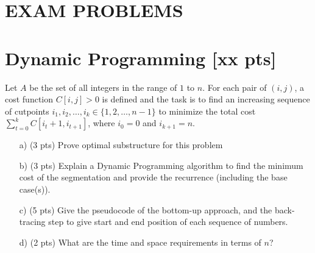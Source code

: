 \documentclass{article}
\begin{document}
\section*{EXAM PROBLEMS}
\color{black}
\section{Dynamic Programming [xx pts]} %
Let $A$ be the set of all integers in the range of $1$ to $n$. For each pair of $(i,j)$, a cost function $C[i,j] > 0$ is defined and the task is to find an increasing sequence of cutpoints $i_1, i_2, \ldots, i_k \in \{1,2,\ldots,n-1\}$ to minimize the total cost $\sum_{t=0}^k C[i_t + 1, i_{t+1}]$, where $i_0=0$ and $i_{k+1} = n$.



\begin{itemize}
\item[a)] (3 pts) Prove optimal substructure for this problem
\item[b)] (3 pts) Explain a Dynamic Programming algorithm to find the minimum cost of the segmentation and provide the recurrence (including the base case(s)).
\item[c)] (5 pts) Give the pseudocode of the bottom-up approach, and the back-tracing step to give start and end position of each sequence of numbers.
\item[d)] (2 pts) What are the time and space requirements in terms of $n$?
\end{itemize}
\end{document}
